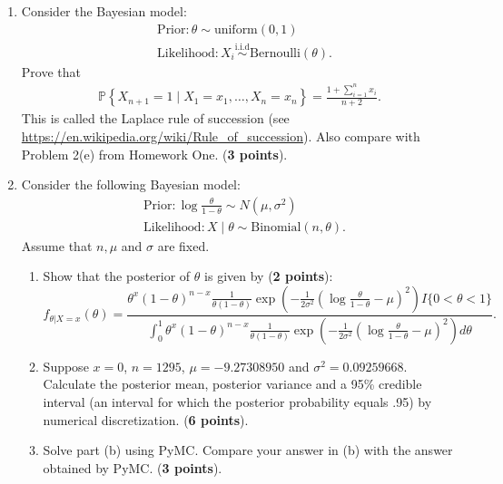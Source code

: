 \documentclass{scrartcl}
\renewcommand{\P}{{\mathbb P}}
\begin{document}
\begin{enumerate}
 \item Consider the Bayesian model:
   \begin{align*}
     &  \text{Prior}: \theta \sim \text{uniform}(0, 1) \\
     & \text{Likelihood}: X_i \overset{\text{i.i.d}}{\sim}
       \text{Bernoulli}(\theta). 
   \end{align*}
   Prove that
   \begin{align*}
     \P \left\{X_{n+1} = 1 \mid X_1= x_1, \dots, X_n = x_n \right\} =
     \frac{1 + \sum_{i=1}^n x_i}{n+2}. 
   \end{align*}
   This is called the Laplace rule of succession (see
   \url{https://en.wikipedia.org/wiki/Rule_of_succession}). Also
   compare with Problem 2(e) from Homework One. (\textbf{3 points}). 

 \item Consider the following Bayesian model:
   \begin{align*}
&   \text{Prior}: \log \frac{\theta}{1 - \theta} \sim N(\mu,
  \sigma^2) \\
& \text{Likelihood}: X \mid \theta \sim \text{Binomial}(n, \theta). 
   \end{align*}
   Assume that $n, \mu$ and $\sigma$ are fixed.
   \begin{enumerate}
   \item Show that the posterior of $\theta$ is given by (\textbf{2 points}):
\begin{equation*}
  f_{\theta | X = x}(\theta) = \frac{ \theta^x (1 - \theta)^{n-x} \frac{1}{\theta(1 - \theta)} \exp \left(-\frac{1}{2 \sigma^2}
    \left(\log \frac{\theta}{1 - \theta} - \mu \right)^2 \right) I\{0
  < \theta < 1\}}{\int_0^1 \theta^x (1 - \theta)^{n-x} \frac{1}{\theta(1 - \theta)} \exp \left(-\frac{1}{2 \sigma^2}
    \left(\log \frac{\theta}{1 - \theta} - \mu \right)^2 \right)
  d\theta }. 
\end{equation*}     
\item Suppose $x = 0$, $n = 1295$, $\mu = -9.27308950$ and $\sigma^{2} =
0.09259668$.  Calculate the posterior mean, posterior variance and a 95\%
  credible interval (an interval for which the posterior probability
  equals .95) by numerical discretization. (\textbf{6 points}).
 \item Solve part (b) using PyMC. Compare your answer in (b) with the
   answer obtained by PyMC. (\textbf{3 points}).  
\end{enumerate}


\end{enumerate}
\end{document}
